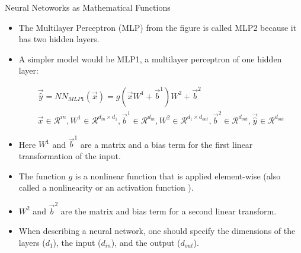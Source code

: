 \documentclass[handout]{beamer}
\begin{document}
\begin{frame}{Neural Netoworks as Mathematical Functions}
\begin{scriptsize}
\begin{itemize}
\item The Multilayer Perceptron (MLP) from the figure is called MLP2 because it has two hidden layers.
\item A simpler model would be MLP1, a multilayer perceptron of one hidden layer:
\begin{center}
\begin{equation}
\begin{split}
\vec{\hat{y}} = NN_{MLP1}(\vec{x}) = g(\vec{x}W^{1}+\vec{b}^{1})W^{2}+\vec{b}^{2} \\
\vec{x} \in \mathcal{R}^{in}, W^{1} \in \mathcal{R}^{d_{in}\times d_{1}}, \vec{b}^{1} \in \mathcal{R}^{d_{in}}, W^{2} \in \mathcal{R}^{d_{1}\times d_{out}}, \vec{b}^{2} \in \mathcal{R}^{d_{out}}, \vec{\hat{y}} \in \mathcal{R}^{d_{out}}    
\end{split}
\end{equation}
\end{center}

\item Here $W^{1}$ and $\vec{b}^{1}$ are a matrix and a bias term for the first linear transformation of the input.
\item The function $g$ is a nonlinear function that is applied element-wise (also called a nonlinearity or an activation function ).
\item $W^{2}$ and $\vec{b}^{2}$ are the matrix and bias term for a second linear transform.

\item When describing a neural network, one should specify the dimensions of the layers ($d_{1}$), the input ($d_{in}$), and the output ($d_{out}$).
\end{itemize}


\end{scriptsize}
\end{frame}
\end{document}

